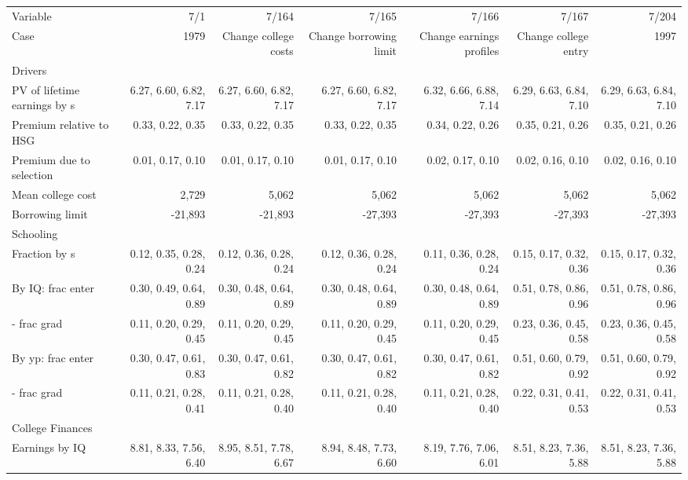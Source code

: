 \begin{tabular}{lrrrrrr}
\hline
Variable & 7/1  & 7/164  & 7/165  & 7/166  & 7/167  & 7/204  \\ 
Case & 1979  & Change college costs  & Change borrowing limit  & Change earnings profiles  & Change college entry  & 1997  \\ 
Drivers &   &   &   &   &   &   \\ 
PV of lifetime earnings by s & 6.27, 6.60, 6.82, 7.17  & 6.27, 6.60, 6.82, 7.17  & 6.27, 6.60, 6.82, 7.17  & 6.32, 6.66, 6.88, 7.14  & 6.29, 6.63, 6.84, 7.10  & 6.29, 6.63, 6.84, 7.10  \\ 
Premium relative to HSG & 0.33, 0.22, 0.35  & 0.33, 0.22, 0.35  & 0.33, 0.22, 0.35  & 0.34, 0.22, 0.26  & 0.35, 0.21, 0.26  & 0.35, 0.21, 0.26  \\ 
Premium due to selection & 0.01, 0.17, 0.10  & 0.01, 0.17, 0.10  & 0.01, 0.17, 0.10  & 0.02, 0.17, 0.10  & 0.02, 0.16, 0.10  & 0.02, 0.16, 0.10  \\ 
Mean college cost & 2,729  & 5,062  & 5,062  & 5,062  & 5,062  & 5,062  \\ 
Borrowing limit & -21,893  & -21,893  & -27,393  & -27,393  & -27,393  & -27,393  \\ 
\hline
Schooling &   &   &   &   &   &   \\ 
Fraction by s & 0.12, 0.35, 0.28, 0.24  & 0.12, 0.36, 0.28, 0.24  & 0.12, 0.36, 0.28, 0.24  & 0.11, 0.36, 0.28, 0.24  & 0.15, 0.17, 0.32, 0.36  & 0.15, 0.17, 0.32, 0.36  \\ 
By IQ: frac enter & 0.30, 0.49, 0.64, 0.89  & 0.30, 0.48, 0.64, 0.89  & 0.30, 0.48, 0.64, 0.89  & 0.30, 0.48, 0.64, 0.89  & 0.51, 0.78, 0.86, 0.96  & 0.51, 0.78, 0.86, 0.96  \\ 
- frac grad & 0.11, 0.20, 0.29, 0.45  & 0.11, 0.20, 0.29, 0.45  & 0.11, 0.20, 0.29, 0.45  & 0.11, 0.20, 0.29, 0.45  & 0.23, 0.36, 0.45, 0.58  & 0.23, 0.36, 0.45, 0.58  \\ 
By yp: frac enter & 0.30, 0.47, 0.61, 0.83  & 0.30, 0.47, 0.61, 0.82  & 0.30, 0.47, 0.61, 0.82  & 0.30, 0.47, 0.61, 0.82  & 0.51, 0.60, 0.79, 0.92  & 0.51, 0.60, 0.79, 0.92  \\ 
- frac grad & 0.11, 0.21, 0.28, 0.41  & 0.11, 0.21, 0.28, 0.40  & 0.11, 0.21, 0.28, 0.40  & 0.11, 0.21, 0.28, 0.40  & 0.22, 0.31, 0.41, 0.53  & 0.22, 0.31, 0.41, 0.53  \\ 
\hline
College Finances &   &   &   &   &   &   \\ 
Earnings by IQ & 8.81, 8.33, 7.56, 6.40  & 8.95, 8.51, 7.78, 6.67  & 8.94, 8.48, 7.73, 6.60  & 8.19, 7.76, 7.06, 6.01  & 8.51, 8.23, 7.36, 5.88  & 8.51, 8.23, 7.36, 5.88  \\ 

\end{tabular}
